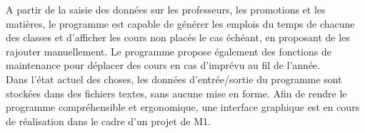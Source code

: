 \documentclass[12pt,a4paper,french]{article}
\begin{document}
A partir de la saisie des données sur les professeurs, les promotions et les matières, le programme est capable de générer les emplois  du temps de chacune des classes et d'afficher les cours non placés le cas échéant, en proposant de les rajouter manuellement. Le programme propose également des fonctions de maintenance pour déplacer des cours en cas d'imprévu au fil de l'année.\\

Dans l'état actuel des choses, les données d'entrée/sortie du programme sont stockées dans des fichiers textes, sans aucune mise en forme. Afin de rendre le programme compréhensible et ergonomique, une interface graphique est en cours de réalisation dans le cadre d'un projet de M1.\\

\newpage
{}
\listoffigures

 \listofalgorithms

\newpage


\end{document}
